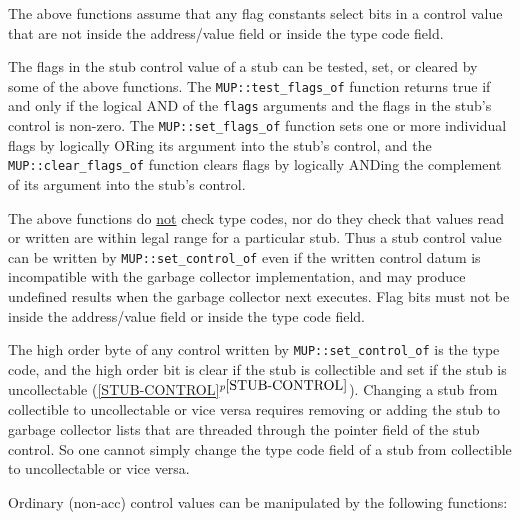 \documentclass[12pt]{article}
\newcommand{\itemref}[1]{\ref{#1}$^{p\pageref{#1}}$}
\begin{document}
The above functions assume that any flag constants select bits
in a control value that are not inside the address/value field
or inside the type code field.

The flags in the stub control value of a stub can be tested, set, or
cleared by some of the above functions.
The \verb|MUP::test_flags_of| function
returns true if and only if the logical AND of the \verb|flags| arguments
and the flags in the stub's control is non-zero.  The \verb|MUP::set_flags_of|
function sets one or more individual flags by logically ORing its
argument into the stub's control, and the
\verb|MUP::clear_flags_of| function clears flags by logically ANDing
the complement of its argument into the stub's control.

The above functions do \underline{not} check type codes, nor do they check
that values read or written are within legal range for a particular
stub.  Thus a stub control value
can be written by \verb|MUP::set_control_of| even if the written
control datum is incompatible with the garbage collector implementation,
and may produce undefined results when the garbage collector
next executes.  Flag bits must not be inside the address/value field
or inside the type code field.

The high order byte of any control written by \verb|MUP::set_control_of|
is the type code, and the high order bit is clear if the stub is collectible
and set if the stub is uncollectable (\itemref{STUB-CONTROL}).
Changing a stub from collectible to uncollectable or vice versa requires
removing or adding the stub to garbage collector lists that are threaded
through the pointer field of the stub control.  So one cannot simply
change the type code field of a stub from collectible to uncollectable
or vice versa.

Ordinary (non-acc) control values can be manipulated by the following functions:
\end{document}
